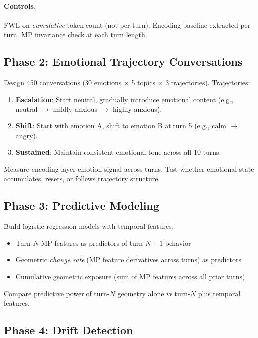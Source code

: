 \documentclass[11pt,letterpaper]{article}
\begin{document}
\paragraph{Controls.} FWL on \emph{cumulative} token count (not
per-turn). Encoding baseline extracted per turn. MP invariance check
at each turn length.

\subsection{Phase 2: Emotional Trajectory Conversations}

Design 450 conversations (30 emotions $\times$ 5 topics $\times$ 3
trajectories). Trajectories:

\begin{enumerate}
  \item \textbf{Escalation}: Start neutral, gradually introduce
    emotional content (e.g., neutral $\to$ mildly anxious $\to$
    highly anxious).
  \item \textbf{Shift}: Start with emotion A, shift to emotion B at
    turn 5 (e.g., calm $\to$ angry).
  \item \textbf{Sustained}: Maintain consistent emotional tone across
    all 10 turns.
\end{enumerate}

\noindent Measure encoding layer emotion signal across turns. Test
whether emotional state accumulates, resets, or follows trajectory
structure.

\subsection{Phase 3: Predictive Modeling}

Build logistic regression models with temporal features:

\begin{itemize}
  \item Turn $N$ MP features as predictors of turn $N+1$ behavior
  \item Geometric \emph{change rate} (MP feature derivatives across
    turns) as predictors
  \item Cumulative geometric exposure (sum of MP features across all
    prior turns)
\end{itemize}

\noindent Compare predictive power of turn-$N$ geometry alone vs
turn-$N$ plus temporal features.

\subsection{Phase 4: Drift Detection}
\end{document}
